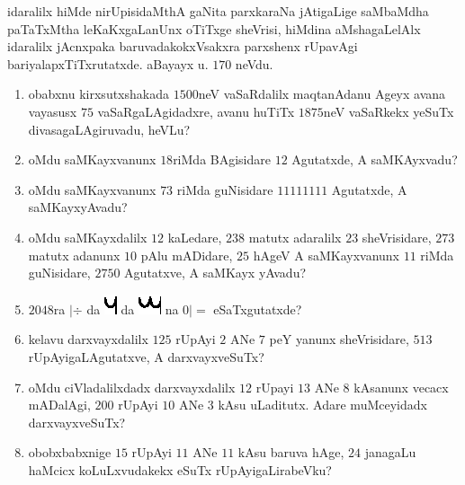 \newpage




idaralilx hiMde nirUpisidaMthA gaNita parxkaraNa jAtigaLige saMbaMdha
paTaTxMtha leKaKxgaLanUnx oTiTxge sheVrisi, hiMdina aMshagaLelAlx
idaralilx jAcnxpaka baruvadakokxVsakxra parxshenx rUpavAgi
bariyalapxTiTxrutatxde. aBayayx u. $170$ neVdu.

\begin{enumerate}
\renewcommand{\theenumi}{\arabic{enumi}}
\renewcommand{\labelenumi}{\rm(\theenumi)}
\item obabxnu kirxsutxshakada $1500$neV vaSaRdalilx maqtanAdanu
Ageyx avana vayasusx $75$ vaSaRgaLAgidadxre, avanu huTiTx $1875$neV
vaSaRkekx yeSuTx divasagaLAgiruvadu, heVLu?

\item oMdu saMKayxvanunx $18$riMda BAgisidare $12$ Agutatxde, A
saMKAyxvadu?

\item oMdu saMKayxvanunx $73$ riMda guNisidare $11111111$ Agutatxde, A
saMKayxyAvadu? 

\item oMdu saMKayxdalilx $12$ kaLedare, $238$ matutx adaralilx $23$
sheVrisidare, $273$ matutx adanunx $10$ pAlu mADidare, $25$ hAgeV A
saMKayxvanunx $11$ riMda guNisidare, $2750$ Agutatxve, A saMKayx
yAvadu? 
\item $2048$ra $|\div$ da \includegraphics{images/u.eps}
da \includegraphics{images/mu.eps} na $0|=$ eSaTxgutatxde?

\item kelavu darxvayxdalilx $125$ rUpAyi $2$ ANe $7$ peY yanunx
sheVrisidare, $513$  rUpAyigaLAgutatxve, A darxvayxveSuTx?

\item oMdu ciVladalilxdadx darxvayxdalilx $12$ rUpayi $13$ ANe $8$
kAsanunx vecacx mADalAgi, $200$ rUpAyi $10$ ANe $3$ kAsu
uLaditutx. Adare muMceyidadx darxvayxveSuTx?

\item obobxbabxnige $15$ rUpAyi $11$ ANe $11$ kAsu baruva hAge, $24$
janagaLu haMcicx koLuLxvudakekx eSuTx rUpAyigaLirabeVku?


\end{enumerate}
